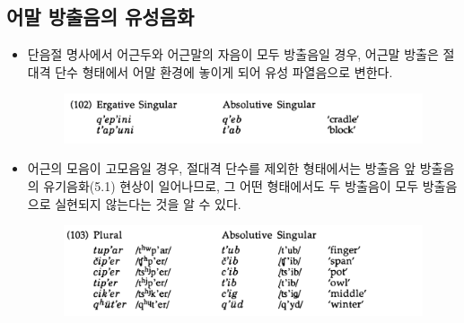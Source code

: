 \subsection{어말 방출음의 유성음화}
\begin{itemize}
\item 단음절 명사에서 어근두와 어근말의 자음이 모두 방출음일 경우, 어근말 방출은 절대격 단수 형태에서 어말 환경에 놓이게 되어 유성 파열음으로 변한다.
\begin{figure}[H]
\centerline{\includegraphics[width=.8\linewidth]{Lezgian/src/ex102.png}}
\end{figure}
\item 어근의 모음이 고모음일 경우, 절대격 단수를 제외한 형태에서는 방출음 앞 방출음의 유기음화(5.1) 현상이 일어나므로, 그 어떤 형태에서도 두 방출음이 모두 방출음으로 실현되지 않는다는 것을 알 수 있다.
\begin{figure}[H]
\centerline{\includegraphics[width=.8\linewidth]{Lezgian/src/ex103.png}}
\end{figure}
\end{itemize}


